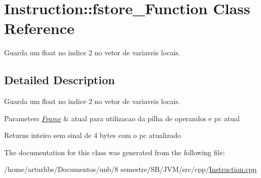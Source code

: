 \hypertarget{classInstruction_1_1fstore__2Function}{}\section{Instruction\+:\+:fstore\+\_\+Function Class Reference}
\label{classInstruction_1_1fstore__2Function}


Guarda um float no indice 2 no vetor de variaveis locais.  




\subsection{Detailed Description}
Guarda um float no indice 2 no vetor de variaveis locais. 


\begin{DoxyParams}{Parameters}
{\em \hyperlink{classFrame}{Frame}} & atual para utilizacao da pilha de operandos e pc atual \\
\hline
\end{DoxyParams}
\begin{DoxyReturn}{Returns}
inteiro sem sinal de 4 bytes com o pc atualizado 
\end{DoxyReturn}


The documentation for this class was generated from the following file\+:\begin{DoxyCompactItemize}
\item 
/home/arturhbs/\+Documentos/unb/8 semestre/\+S\+B/\+J\+V\+M/src/cpp/\hyperlink{Instruction_8cpp}{Instruction.\+cpp}\end{DoxyCompactItemize}
